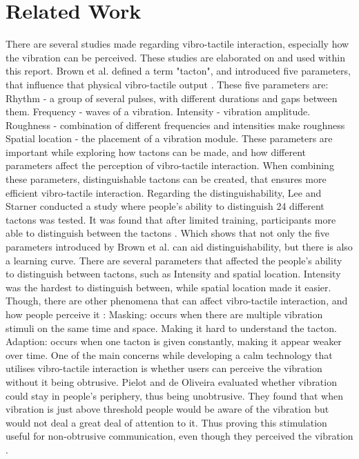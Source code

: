 \documentclass{sigchi}
\begin{document}
\section{Related Work}
There are several studies made regarding vibro-tactile interaction, especially how the vibration can be perceived. These studies are elaborated on and used within this report.  Brown et al. defined a term "tacton", and introduced five parameters, that influence that physical vibro-tactile output \cite{brown06}. These five parameters are:
\newline
\newline
Rhythm - a group of several pulses, with different durations and gaps between them.   
Frequency - waves of a vibration. 
Intensity - vibration amplitude. 
Roughness - combination of different frequencies and intensities make roughness 
Spatial location - the placement of a vibration module.  
\newline
\newline 
These parameters are important while exploring how tactons can be made, and how different parameters affect the perception of vibro-tactile interaction. When combining these parameters, distinguishable tactons can be created, that ensures more efficient vibro-tactile interaction. Regarding the distinguishability, Lee and Starner conducted a study where people's ability to distinguish 24 different tactons was tested. It was found that after limited training, participants more able to distinguish between the tactons \cite{lee10}. Which shows that not only the five parameters introduced by Brown et al. can aid distinguishability, but there is also a learning curve. 
\newline
\newline
There are several parameters that affected the people's ability to distinguish between tactons, such as Intensity and spatial location. Intensity was the hardest to distinguish between, while spatial location made it easier. Though, there are other phenomena that can affect vibro-tactile interaction, and how people perceive it \cite{myles07}: 
\newline
\newline 
Masking: occurs when there are multiple vibration stimuli on the same time and space. Making it hard to understand the tacton. 
Adaption: occurs when one tacton is given constantly, making it appear weaker over time. 
\newline
\newline 
One of the main concerns while developing a calm technology that utilises vibro-tactile interaction is whether users can perceive the vibration without it being obtrusive. Pielot and de Oliveira evaluated whether vibration could stay in people's periphery, thus being unobtrusive. They found that when vibration is just above threshold people would be aware of the vibration but would not deal a great deal of attention to it. Thus proving this stimulation useful for non-obtrusive communication, even though they perceived the vibration \cite{pielot13}.  
\end{document}
